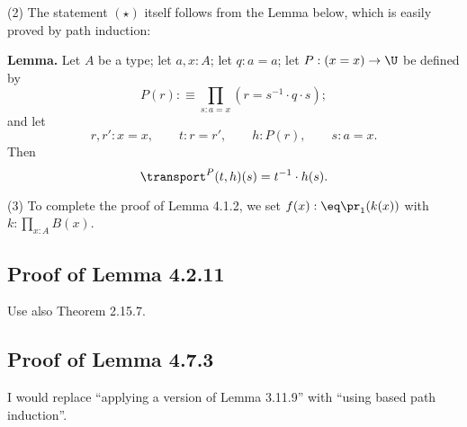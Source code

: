 \documentclass[12pt]{article}
\begin{document}
\nn(2) The statement $(\star)$ itself follows from the Lemma below, which is easily proved by path induction:

\nn\textbf{Lemma.} Let $A$ be a type; let $a,x:A$; let $q:a=a$; let $P:(x=x)\to\U$ be defined by 
$$
P(r):\equiv\prod_{s:a=x}(r=s^{-1}\cdot q\cdot s);
$$ 
and let 
$$
r,r':x=x,\qquad t:r=r',\qquad h:P(r),\qquad s:a=x.
$$ 
Then 
$$
\transport^P(t,h)(s)=t^{-1}\cdot h(s).
$$ 

\nn(3) To complete the proof of Lemma 4.1.2, we set $f(x):\eq\pr_1(k(x))$ with $k:\prod_{x:A}B(x)$.


\subsection{Proof of Lemma 4.2.11}

Use also Theorem 2.15.7.





\subsection{Proof of Lemma 4.7.3}

I would replace ``applying a version of Lemma 3.11.9'' with ``using based path induction''.

\end{document}
